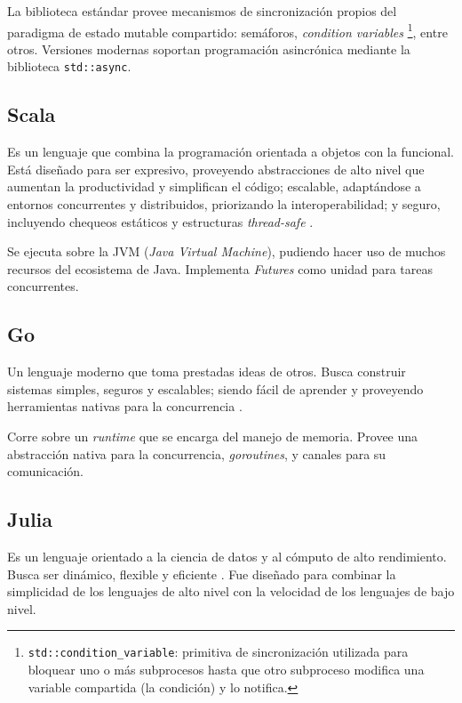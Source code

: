 \documentclass[11pt]{article}
\let\Oldsubsection\subsection
\renewcommand{\subsection}{\FloatBarrier\Oldsubsection}
\newcommand{\english}[1]{\textit{#1}}
\newcommand{\technical}[1]{\textit{#1}}
\begin{document}
La biblioteca estándar provee mecanismos de sincronización propios del paradigma de estado mutable compartido: semáforos, \english{condition variables} \footnote{\lstinline{std::condition_variable}: primitiva de sincronización utilizada para bloquear uno o más subprocesos hasta que otro subproceso modifica una variable compartida (la condición) y lo notifica.}, entre otros. Versiones modernas soportan programación asincrónica mediante la biblioteca \lstinline{std::async}.

\subsection{Scala}

Es un lenguaje que combina la programación orientada a objetos con la funcional. Está diseñado para ser expresivo, proveyendo abstracciones de alto nivel que aumentan la productividad y simplifican el código; escalable, adaptándose a entornos concurrentes y distribuidos, priorizando la interoperabilidad; y seguro, incluyendo chequeos estáticos y estructuras \english{thread-safe} \cite{com:scala}.

Se ejecuta sobre la JVM (\technical{Java Virtual Machine}), pudiendo hacer uso de muchos recursos del ecosistema de Java. Implementa \english{Futures} como unidad para tareas concurrentes.

\subsection{Go}

Un lenguaje moderno que toma prestadas ideas de otros. Busca construir sistemas simples, seguros y escalables; siendo fácil de aprender y proveyendo herramientas nativas para la concurrencia \cite{com:go}.

Corre sobre un \english{runtime} que se encarga del manejo de memoria. Provee una abstracción nativa para la concurrencia, \technical{goroutines}, y canales para su comunicación.

\subsection{Julia}

Es un lenguaje orientado a la ciencia de datos y al cómputo de alto rendimiento. Busca ser dinámico, flexible y eficiente \cite{com:julia}. Fue diseñado para combinar la simplicidad de los lenguajes de alto nivel con la velocidad de los lenguajes de bajo nivel.
\end{document}
